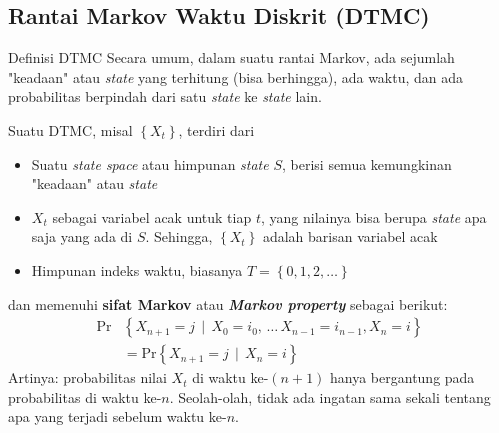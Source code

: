 \documentclass{beamer}
\newcommand{\pars}[1]{\left(#1\right)}
\newcommand{\braces}[1]{\left\{#1\right\}}
\begin{document}
\subsection{Rantai Markov Waktu Diskrit (DTMC)}

\begin{frame}{Definisi DTMC}
    Secara umum, dalam suatu rantai Markov, ada sejumlah "keadaan" atau \textit{state} yang terhitung (bisa berhingga), ada waktu, dan ada probabilitas berpindah dari satu \textit{state} ke \textit{state} lain.

    Suatu DTMC, misal \( \braces{X_t} \), terdiri dari
    \begin{itemize}
        \item Suatu \textit{state space} atau himpunan \textit{state} \( S \), berisi semua kemungkinan "keadaan" atau \textit{state}
        \item $X_t$ sebagai variabel acak untuk tiap \( t \), yang nilainya bisa berupa \textit{state} apa saja yang ada di \( S \). Sehingga, \( \braces{X_t} \) adalah barisan variabel acak
        \item Himpunan indeks waktu, biasanya \( T = \braces{0, 1, 2, \dots} \)
    \end{itemize}
    dan memenuhi \textbf{sifat Markov} atau \textbf{\textit{Markov property}} sebagai berikut:
    \begin{align*}
        \text{Pr}&\braces{X_{n+1} = j \, \mid \, X_0 = i_0, \, \dots \, X_{n-1} = i_{n-1}, X_n = i} \\
        &= \text{Pr}\braces{X_{n+1} = j \, \mid \, X_n = i}
    \end{align*}
    Artinya: probabilitas nilai \( X_t \) di waktu ke-\(\pars{n+1}\) hanya bergantung pada probabilitas di waktu ke-\(n\). Seolah-olah, tidak ada ingatan sama sekali tentang apa yang terjadi sebelum waktu ke-\(n\).

\end{frame}
\end{document}
